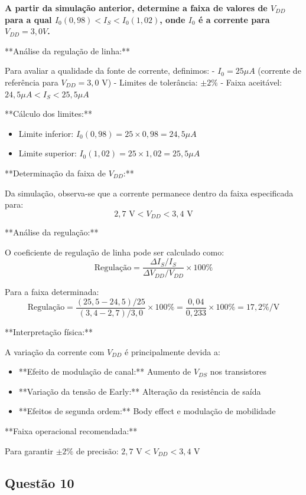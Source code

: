 \documentclass[12pt,a4paper]{article}
\begin{document}
\textbf{A partir da simulação anterior, determine a faixa de valores de $V_{DD}$ para a qual $I_0(0,98) < I_S < I_0(1,02)$, onde $I_0$ é a corrente para $V_{DD} = 3,0V$.}

**Análise da regulação de linha:**

Para avaliar a qualidade da fonte de corrente, definimos:
- $I_0 = 25 \mu A$ (corrente de referência para $V_{DD} = 3,0$ V)
- Limites de tolerância: $\pm 2\%$
- Faixa aceitável: $24,5 \mu A < I_S < 25,5 \mu A$

**Cálculo dos limites:**
\begin{itemize}
    \item Limite inferior: $I_0(0,98) = 25 \times 0,98 = 24,5 \mu A$
    \item Limite superior: $I_0(1,02) = 25 \times 1,02 = 25,5 \mu A$
\end{itemize}

**Determinação da faixa de $V_{DD}$:**

Da simulação, observa-se que a corrente permanece dentro da faixa especificada para:
$$2,7 \text{ V} < V_{DD} < 3,4 \text{ V}$$

**Análise da regulação:**

O coeficiente de regulação de linha pode ser calculado como:
$$\text{Regulação} = \frac{\Delta I_S / I_S}{\Delta V_{DD} / V_{DD}} \times 100\% $$

Para a faixa determinada:
$$\text{Regulação} = \frac{(25,5-24,5)/25}{(3,4-2,7)/3,0} \times 100\% = \frac{0,04}{0,233} \times 100\% = 17,2\%/\text{V}$$

**Interpretação física:**

A variação da corrente com $V_{DD}$ é principalmente devida a:
\begin{itemize}
    \item **Efeito de modulação de canal:** Aumento de $V_{DS}$ nos transistores
    \item **Variação da tensão de Early:** Alteração da resistência de saída
    \item **Efeitos de segunda ordem:** Body effect e modulação de mobilidade
\end{itemize}

**Faixa operacional recomendada:**

Para garantir $\pm 2\%$ de precisão: $\boxed{2,7 \text{ V} < V_{DD} < 3,4 \text{ V}}$

\subsection*{Questão 10}
\end{document}
